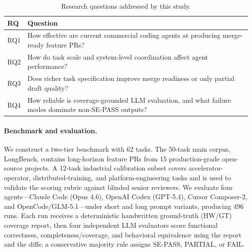 \begin{table}[t]
\caption{Research questions addressed by this study.}
\label{tab:rqs}
\centering
\small
\begin{tabularx}{\columnwidth}{@{}lY@{}}
\toprule
\textbf{RQ} & \textbf{Question} \\
\midrule
RQ1 & How effective are current commercial coding agents at producing merge-ready feature PRs? \\
RQ2 & How do task scale and system-level coordination affect agent performance? \\
RQ3 & Does richer task specification improve merge readiness or only partial draft quality? \\
RQ4 & How reliable is coverage-grounded LLM evaluation, and what failure modes dominate non-SE-PASS outputs? \\
\bottomrule
\end{tabularx}
\end{table}

\paragraph{Benchmark and evaluation.}
We construct a two-tier benchmark with 62 tasks. The 50-task main corpus, LongBench, contains long-horizon feature PRs from 15 production-grade open-source projects. A 12-task industrial calibration subset covers accelerator-operator, distributed-training, and platform-engineering tasks and is used to validate the scoring rubric against blinded senior reviewers. We evaluate four agents---Claude Code (Opus 4.6), OpenAI Codex (GPT-5.4), Cursor Composer-2, and OpenCode/GLM-5.1---under short and long prompt variants, producing 496 runs. Each run receives a deterministic handwritten ground-truth (HW/GT) coverage report, then four independent LLM evaluators score functional correctness, completeness/coverage, and behavioral equivalence using the report and the diffs; a conservative majority rule assigns SE-PASS, PARTIAL, or FAIL.

